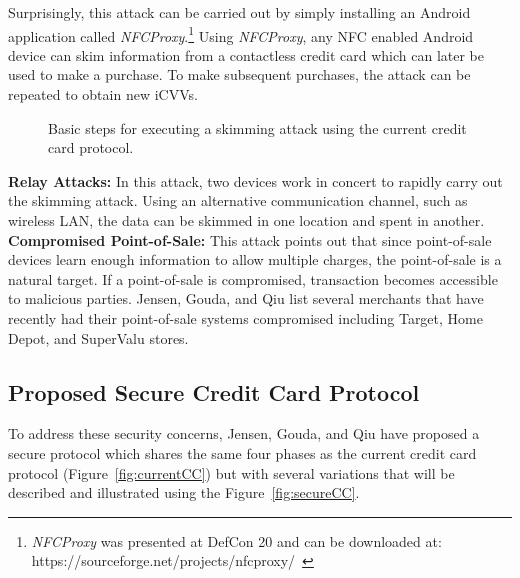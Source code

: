 \documentclass{sig-alternate}
\begin{document}
Surprisingly, this attack can be carried out by simply installing an Android application called \textit{NFCProxy}.\footnote{\textit{NFCProxy} was presented at DefCon 20 and can be downloaded at: https://sourceforge.net/projects/nfcproxy/~\cite{CC2016}}
Using \textit{NFCProxy}, any NFC enabled Android device can skim information from a contactless credit card which can later be used to make a purchase. To make subsequent purchases, the attack can be repeated to obtain new iCVVs.
\begin{figure}
\centering
{}
\caption{Basic steps for executing a skimming attack using the current credit card protocol.~\cite{CC2016}}
\label{fig:skim}
\end{figure}
\vspace{2mm}\newline
\noindent\textbf{Relay Attacks:}
In this attack, two devices work in concert to rapidly carry out the skimming attack. Using an alternative communication channel, such as wireless LAN, the data can be skimmed in one location and spent in another.
\vspace{2mm}\newline
\noindent\textbf{Compromised Point-of-Sale:}
This attack points out that since point-of-sale devices learn enough information to allow multiple charges, the point-of-sale is a natural target. If a point-of-sale is compromised, transaction becomes accessible to malicious parties. Jensen, Gouda, and Qiu list several merchants that have recently had their point-of-sale systems compromised including Target, Home Depot, and SuperValu stores.

\subsection{Proposed Secure Credit Card Protocol}
To address these security concerns, Jensen, Gouda, and Qiu have proposed a secure protocol which shares the same four phases as the current credit card protocol (Figure~\ref{fig:currentCC}) but with several variations that will be described and illustrated using the Figure~\ref{fig:secureCC}.
\end{document}
